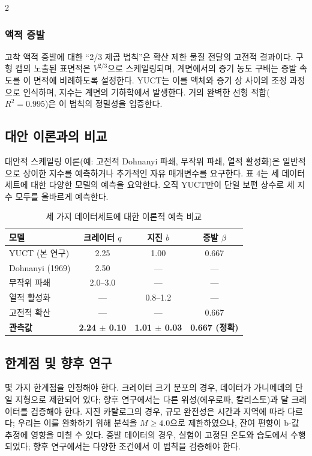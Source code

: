 \documentclass[11pt,a4paper]{article}
\begin{document}
\begin{multicols}{2}
		\subsubsection{액적 증발}
		고착 액적 증발에 대한 “2/3 제곱 법칙”은 확산 제한 물질 전달의 고전적 결과이다. 구형 캡의 노출된 표면적은 \(V^{2/3}\)으로 스케일링되며, 계면에서의 증기 농도 구배는 증발 속도를 이 면적에 비례하도록 설정한다. YUCT는 이를 액체와 증기 상 사이의 조정 과정으로 인식하며, 지수는 계면의 기하학에서 발생한다. 거의 완벽한 선형 적합(\(R^2 = 0.995\))은 이 법칙의 정밀성을 입증한다.
		
		\subsection{대안 이론과의 비교}
		
		대안적 스케일링 이론(예: 고전적 Dohnanyi 파쇄, 무작위 파쇄, 열적 활성화)은 일반적으로 상이한 지수를 예측하거나 추가적인 자유 매개변수를 요구한다. 표 4는 세 데이터세트에 대한 다양한 모델의 예측을 요약한다. 오직 YUCT만이 단일 보편 상수로 세 지수 모두를 올바르게 예측한다.
		
		\begin{table}[htbp]
			\centering
			\caption{세 가지 데이터세트에 대한 이론적 예측 비교}
			\label{tab:comparison2}
			\begin{tabular}{lccc}
				\toprule
				\textbf{모델} & \textbf{크레이터 \(q\)} & \textbf{지진 \(b\)} & \textbf{증발 \(\beta\)} \\
				\midrule
				YUCT (본 연구) & 2.25 & 1.00 & 0.667 \\
				Dohnanyi (1969) & 2.50 & — & — \\
				무작위 파쇄 & 2.0–3.0 & — & — \\
				열적 활성화 & — & 0.8–1.2 & — \\
				고전적 확산 & — & — & 0.667 \\
				\textbf{관측값} & \textbf{2.24 $\pm$ 0.10} & \textbf{1.01 $\pm$ 0.03} & \textbf{0.667 (정확)} \\
				\bottomrule
			\end{tabular}
		\end{table}
		
		\subsection{한계점 및 향후 연구}
		
		몇 가지 한계점을 인정해야 한다. 크레이터 크기 분포의 경우, 데이터가 가니메데의 단일 지형으로 제한되어 있다; 향후 연구에서는 다른 위성(에우로파, 칼리스토)과 달 크레이터를 검증해야 한다. 지진 카탈로그의 경우, 규모 완전성은 시간과 지역에 따라 다르다; 우리는 이를 완화하기 위해 분석을 \(M \ge 4.0\)으로 제한하였으나, 잔여 편향이 b-값 추정에 영향을 미칠 수 있다. 증발 데이터의 경우, 실험이 고정된 온도와 습도에서 수행되었다; 향후 연구에서는 다양한 조건에서 이 법칙을 검증해야 한다.
		

\end{multicols}
\end{document}
